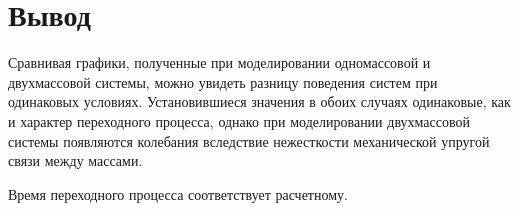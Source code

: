 \section{Вывод}

Сравнивая графики, полученные при моделировании одномассовой и двухмассовой системы, можно увидеть разницу поведения систем при одинаковых условиях.
Установившиеся значения в обоих случаях одинаковые, как и характер переходного процесса, однако при моделировании двухмассовой системы появляются колебания вследствие нежесткости механической упругой связи между массами.

Время переходного процесса соответствует расчетному.